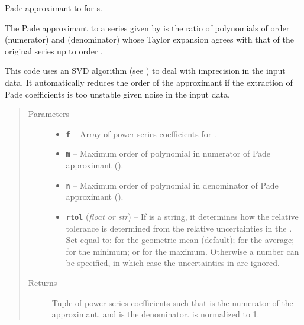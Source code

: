 \documentclass[letterpaper,10pt,english]{sphinxmanual}
\begin{document}

\begin{fulllineitems}
\label{g2tools:g2tools.pade_gvar}
\code{{[}m,n{]}} Pade approximant to  for s.

The \code{{[}m,n{]}} Pade approximant to a series given by
 is the ratio of  polynomials of order 
(numerator) and  (denominator) whose  Taylor expansion agrees
with that of the original series up to order .

This code uses an SVD algorithm (see {\hyperref[g2tools:g2tools.pade_svd]{\emph{}}}) to deal with
imprecision in the input data. It automatically reduces
the order of the approximant if the extraction of Pade coefficients
is too unstable given noise in the input data.
\begin{quote}\begin{description}
\item[{Parameters}] \leavevmode\begin{itemize}
\item {} 
\textbf{\texttt{f}} -- Array  of power series coefficients for .

\item {} 
\textbf{\texttt{m}} -- Maximum order of polynomial in numerator of Pade
approximant ().

\item {} 
\textbf{\texttt{n}} -- Maximum order of polynomial in denominator of Pade
approximant ().

\item {} 
\textbf{\texttt{rtol}} (\emph{float or str}) -- If  is a string, it determines how the
relative tolerance is determined from the relative
uncertainties in the . Set  equal to:
 for the geometric mean (default);  for
the average;  for the minimum; or  for
the maximum. Otherwise a number can be specified, in which case
the uncertainties in  are ignored.

\end{itemize}

\item[{Returns}] \leavevmode
Tuple of power series coefficients  such that
 is the numerator of the approximant,
and  is the denominator.  is
normalized to 1.

\end{description}\end{quote}

\end{fulllineitems}
\end{document}
